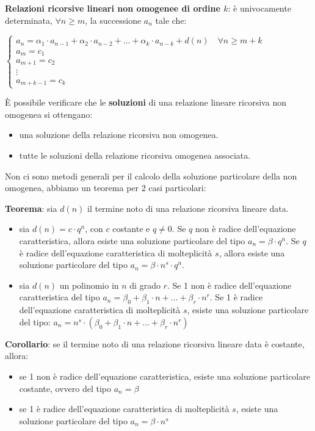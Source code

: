 \begin{flushleft}
    \textbf{Relazioni ricorsive lineari non omogenee di ordine $k$}: è univocamente determinata, $\forall n \geq m$, la successione $a_n$ tale che:
    
    {\centering
        $\begin{cases}
            a_n = \alpha_1 \cdot a_{n-1} + \alpha_2 \cdot a_{n-2} + ... + \alpha_k \cdot a_{n-k} + d(n) \quad \forall n \geq m+k \\
            a_m = c_1 \\
            a_{m+1} = c_2 \\
            \vdots \\
            a_{m+k-1} = c_k
        \end{cases}$
    \par}
    È possibile verificare che le \textbf{soluzioni} di una relazione lineare ricorsiva non omogenea si ottengano: 
    \begin{itemize}[nosep]
        \item una soluzione della relazione ricorsiva non omogenea.
        \item tutte le soluzioni della relazione ricorsiva omogenea associata.
    \end{itemize}
    Non ci sono metodi generali per il calcolo della soluzione particolare della non omogenea, abbiamo un teorema per 2 casi particolari:
    
    \newpage
    \textbf{Teorema}: sia $d(n)$ il termine noto di una relazione ricorsiva lineare data.
    \begin{itemize}[nosep]
        \item sia $d(n) = c \cdot q^n$, con $c$ costante e $q \neq 0$. Se $q$ non è radice dell'equazione caratteristica, allora esiste una soluzione particolare del tipo $a_n = \beta \cdot q^n$. Se $q$ è radice dell'equazione caratteristica di molteplicità $s$, allora esiste una soluzione particolare del tipo $a_n = \beta \cdot n^s \cdot q^n$.
        \item sia $d(n)$ un polinomio in $n$ di grado $r$. Se 1 non è radice dell'equazione caratteristica del tipo $a_n = \beta_0 + \beta_1 \cdot n + ... + \beta_r \cdot n^r$. Se 1 è radice dell'equazione caratteristica di molteplicità $s$, esiste una soluzione particolare del tipo: $a_n = n^s \cdot (\beta_0 + \beta_1 \cdot n + ... + \beta_r \cdot n^r)$
    \end{itemize}
    \textbf{Corollario}: se il termine noto di una relazione ricorsiva lineare data è costante, allora:
    \begin{itemize}[nosep]
        \item se 1 non è radice dell'equazione caratteristica, esiste una soluzione particolare costante, ovvero del tipo $a_n = \beta$
        \item se 1 è radice dell'equazione caratteristica di molteplicità $s$, esiste una soluzione particolare del tipo $a_n = \beta \cdot n^s$
    \end{itemize}
\end{flushleft}
